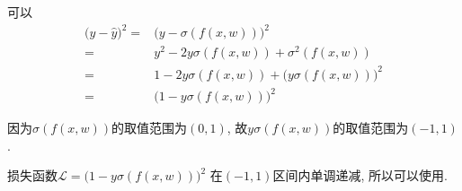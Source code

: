 \documentclass[../main.tex]{subfiles}
\begin{document}
可以
\begin{align*}
\big( y - \hat{y} \big)^2
= & \big( y - \sigma(f(x,w)) \big)^2 \\
= & y^2 - 2 y \sigma(f(x,w)) + \sigma^2(f(x,w)) \\
= & 1 - 2y \sigma(f(x,w)) + \big(y\sigma(f(x,w)) \big)^2 \\
= & \big( 1 - y \sigma(f(x,w)) \big)^2
\end{align*}

因为$\sigma(f(x,w))$的取值范围为$(0,1)$,
故$y\sigma(f(x,w))$的取值范围为$(-1,1)$.

损失函数$\mathcal{L} = \big( 1 - y \sigma(f(x,w)) \big)^2$
在$(-1,1)$区间内单调递减, 所以可以使用.
\end{document}
